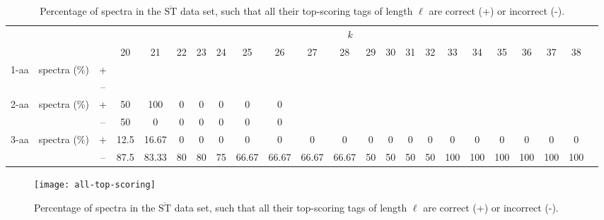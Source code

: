 \documentclass{article}[12pt]
\def\STbar{{\overline{\mathrm{ST}}}}
\begin{document}
\begin{landscape}
\begin{table}[ht]
\vspace{3mm}
\end{table}
\begin{table}[ht]\tiny
\vspace{3mm}
{\centering
\begin{center}
\begin{tabular}{|c|cc|c|c|c|c|c|c|c|c|c|c|c|c|c|c|c|c|c|c|c|c|}
  \hline
  \multicolumn{3}{|c|}{ } & \multicolumn{ 19}{|c|}{$k$} \\
  \cline{4-22 }
  \multicolumn{3}{|c|}{ } 
 & 20 & 21 & 22 & 23 & 24 & 25 & 26 & 27 & 28 & 29 & 30 & 31 & 32 & 33 & 34 & 35 & 36 & 37 & 38\\
\hline
  \multirow{2}{*}{1-aa}& \multirow{2}{*}{spectra (\%)}  &  +
 &  &  &  &  &  &  &  &  &  &  &  &  &  &  &  &  &  &  & \\
 & 
 &  --
 &  &  &  &  &  &  &  &  &  &  &  &  &  &  &  &  &  &  & \\
\hline
  \multirow{2}{*}{2-aa}& \multirow{2}{*}{spectra (\%)}  &  +
 & 50 & 100 & 0 & 0 & 0 & 0 & 0 &  &  &  &  &  &  &  &  &  &  &  & \\
 & 
 &  --
 & 50 & 0 & 0 & 0 & 0 & 0 & 0 &  &  &  &  &  &  &  &  &  &  &  & \\
\hline
  \multirow{2}{*}{3-aa}& \multirow{2}{*}{spectra (\%)}  &  +
 & 12.5 & 16.67 & 0 & 0 & 0 & 0 & 0 & 0 & 0 & 0 & 0 & 0 & 0 & 0 & 0 & 0 & 0 & 0 & 0\\
 & 
 &  --
 & 87.5 & 83.33 & 80 & 80 & 75 & 66.67 & 66.67 & 66.67 & 66.67 & 50 & 50 & 50 & 50 & 100 & 100 & 100 & 100 & 100 & 100 \\
  \hline
\end{tabular}
\end{center}
\par}
\centering

\caption{Percentage of spectra in the $\STbar$ data set, such that all their top-scoring tags of length $\ell$ are correct (+) or incorrect (-).}
\label{table:all-top-scoring}

\vspace{3mm}
\end{table}
\end{landscape}

\begin{figure}
  \begin{center}
\texttt{[image: all-top-scoring]}
\end{center}
\caption{Percentage of spectra in the $\STbar$ data set, such that all their top-scoring tags of length $\ell$ are correct (+) or incorrect (-).}
  \label{fig:all-top-scoring}
\end{figure}
\end{document}
